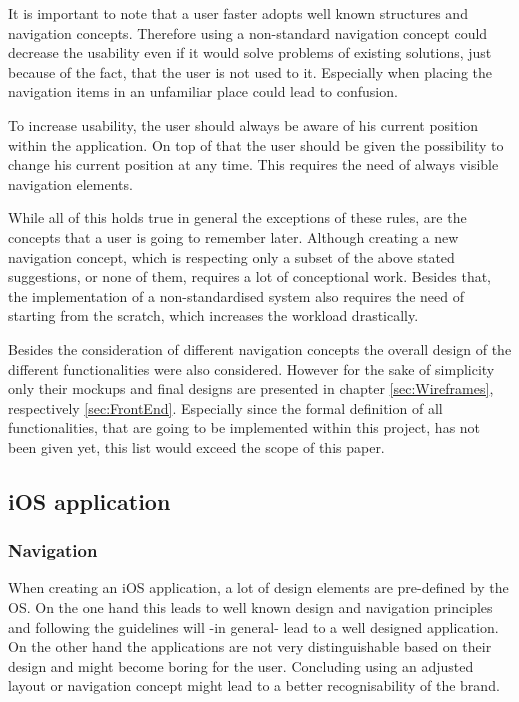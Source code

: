 It is important to note that a user faster adopts well known structures and navigation concepts. Therefore using a non-standard navigation concept could decrease the usability even if it would solve problems of existing solutions, just because of the fact, that the user is not used to it. Especially when placing the navigation items in an unfamiliar place could lead to confusion. \cite{Crestodina:2015aa}

To increase usability, the user should always be aware of his current position within the application. On top of that the user should be given the possibility to change his current position at any time. This requires the need of always visible navigation elements. 

While all of this holds true in general the exceptions of these rules, are the concepts that a user is going to remember later. Although creating a new navigation concept, which is respecting only a subset of the above stated suggestions, or none of them, requires a lot of conceptional work. Besides that, the implementation of a non-standardised system also requires the need of starting from the scratch, which increases the workload drastically. \cite{Hampton-Smith:2013aa}

Besides the consideration of different navigation concepts the overall design of the different functionalities were also considered. However for the sake of simplicity only their mockups and final designs are presented in chapter \vref{sec:Wireframes}, respectively  \vref{sec:FrontEnd}. Especially since the formal definition of all functionalities, that are going to be implemented within this project, has not been given yet, this list would exceed the scope of this paper.

\subsection{iOS application}
\label{sec:UIConceptiOS}
\subsubsection{Navigation}
When creating an iOS application, a lot of design elements are pre-defined by the \gls{OS}. On the one hand this leads to well known design and navigation principles and following the guidelines will -in general- lead to a well designed application. On the other hand the applications are not very distinguishable based on their design and might become boring for the user. Concluding using an adjusted layout or navigation concept might lead to a better recognisability of the brand. 

